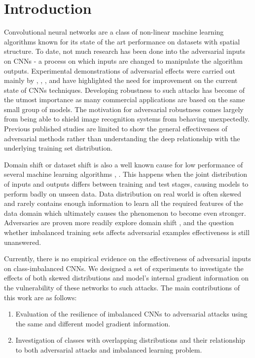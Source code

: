 \documentclass[runningheads,a4paper]{llncs}
\begin{document}
\section{Introduction}


Convolutional neural networks are a class of non-linear machine learning algorithms known for its state of the art performance on datasets with spatial structure. To date, not much research has been done into the adversarial inputs on CNNs - a process on which inputs are changed to manipulate the algorithm outputs. Experimental demonstrations of adversarial effects were carried out mainly by \cite{billovits}, \cite{goodfellow2014}, \cite{goodfellow2016}, \cite{papernot2016} and have highlighted the need for improvement on the current state of CNNs techniques. Developing robustness to such attacks has become of the utmost importance as many commercial applications are based on the same small group of models. The motivation for adversarial robustness comes largely from being able to shield image recognition systems from behaving unexpectedly. Previous published studies are limited to show the general effectiveness of adversarial methods rather than understanding the deep relationship with the underlying training set distribution. 

Domain shift or dataset shift \cite{Quionero} is also a well known cause for low performance of several machine learning algorithms \cite{japkowicz2002class}, \cite{krawczyk2016learning}. This happens when the joint distribution of inputs and outputs differs between training and test stages, causing models to perform badly on unseen data. Data distribution on real world is often skewed and rarely contains enough information to learn all the required features of the data domain which ultimately causes the phenomenon to become even stronger. Adversaries are proven more readily explore domain shift \cite{lowd2005}, \cite{Laskov2010} and the question whether imbalanced training sets affects adversarial examples effectiveness is still unanswered. 

Currently, there is no empirical evidence on the effectiveness of adversarial inputs on class-imbalanced CNNs. We designed a set of experiments to investigate the effects of both skewed distributions and model's internal gradient information on the vulnerability of these networks to such attacks. The main contributions of this work are as follows: 
\begin{enumerate}
\item Evaluation of the resilience of imbalanced CNNs to adversarial attacks using the same and different model gradient information.
\item Investigation of classes with overlapping distributions and their relationship to both adversarial attacks and imbalanced learning problem.
\end{enumerate}
\end{document}
